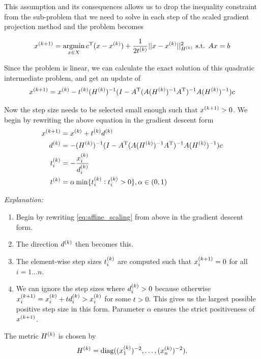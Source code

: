 \documentclass[12pt,a4paper]{article}
\begin{document}
This assumption and its consequences allows us to drop the inequality constraint from the sub-problem that we need to solve in each step of the scaled gradient projection method and the problem becomes

\begin{equation*}
  \kth[k+1]{x} = \argmin_{x \in X} \T{c} (x - \kth{x}) + \frac{1}{2\kth{t}} ||x - \kth{x}||^{2}_{\kth{H}} \text{ s.t. } Ax=b
\end{equation*}

Since the problem is linear, we can calculate the exact solution of this quadratic intermediate
problem, and get an update of
\begin{equation}
\label{eq:affine_scaling}
    \kth[k+1]{x} = \kth{x} - \kth{t}(\kth{H})^{-1} (I - \T{A} (A(\kth{H})^{-1} \T{A})^{-1} A (\kth{H})^{-1})c
\end{equation}

Now the step size needs to be selected small enough such that $\kth[k+1]{x} > 0$.
We begin by rewriting the above equation in the gradient descent form
\begin{align}
\kth[k+1]{x} &= \kth{x} + \kth{t} \kth{d}\\
\kth{d} &= -(\kth{H})^{-1} (I-\T{A}(A(\kth{H})^{-1} \T{A})^{-1} A(\kth{H})^{-1})c\\
\kth{t}_{i} &= -\frac{\kth{x}_{i}}{\kth{d}_{i}}\\
\kth{t} &= \alpha \min \{ \kth{t}_{i} : \kth{t}_{i} > 0 \}, \alpha \in (0,1)
\end{align}

\emph{Explanation:}
\begin{enumerate}[(1)]
    \item Begin by rewriting \autoref{eq:affine_scaling} from above in the gradient descent form.
    \item The direction $\kth{d}$ then becomes this.
    \item The element-wise step sizes $\kth{t}_{i}$ are computed such that $\kth[k+1]{x}_{i} = 0$ for all $i = 1 \dots n$.
    \item We can ignore the step sizes where $\kth{d}_{i} > 0$ because otherwise $\kth[k+1]{x}_{i} = \kth{x}_{i} + t \kth{d}_{i} > \kth{x}_{i}$ for some $t > 0$. This gives us the largest possible positive step size in this form. Parameter $\alpha$ ensures the strict positiveness of $\kth[k+1]{x}$.
\end{enumerate}

The metric $\kth{H}$ is chosen by
\begin{equation*}
  \kth{H} = \diag((\kth{x}_1)^{-2}, \dots, (\kth{x}_n)^{-2}).
\end{equation*}
\end{document}
